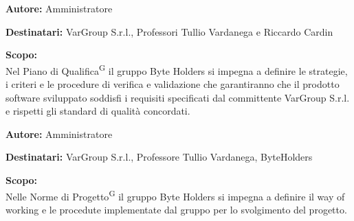 \documentclass[a4paper, 11pt]{article}
\begin{document}

\begin{tcolorbox}[
    colback=LightGray,       %
    colframe=AccentColor,    %
    coltitle=white,          %
    fonttitle=\bfseries\large,
    boxrule=0.5mm,           %
    arc=2mm,                 %
    title={Piano di Qualifica\textsuperscript{G}} %
]
    \textbf{\textcolor{AccentDark}{Autore:}} Amministratore  %
    
    \vspace{0.2cm} %
    \textbf{\textcolor{AccentDark}{Destinatari:}} VarGroup S.r.l., Professori Tullio Vardanega e Riccardo Cardin

    \vspace{0.2cm} %

    \textbf{\textcolor{AccentDark}{Scopo:}} \\
    Nel Piano di Qualifica\textsuperscript{G} il gruppo Byte Holders si impegna a definire le strategie, i criteri e le procedure di verifica e validazione che garantiranno che il prodotto software sviluppato soddisfi i requisiti specificati dal committente VarGroup S.r.l. e rispetti gli standard di qualità concordati.

\end{tcolorbox}



\begin{tcolorbox}[
    colback=LightGray,       %
    colframe=AccentColor,    %
    coltitle=white,          %
    fonttitle=\bfseries\large,
    boxrule=0.5mm,           %
    arc=2mm,                 %
    title={Norme di Progetto\textsuperscript{G}} %
]
    \textbf{\textcolor{AccentDark}{Autore:}} Amministratore  %
    
    \vspace{0.2cm} %
    \textbf{\textcolor{AccentDark}{Destinatari:}} VarGroup S.r.l., Professore Tullio Vardanega, ByteHolders

    \vspace{0.2cm} %

    \textbf{\textcolor{AccentDark}{Scopo:}} \\
    Nelle Norme di Progetto\textsuperscript{G} il gruppo Byte Holders si impegna a definire il way of working e le procedute implementate dal gruppo per lo svolgimento del progetto.
\end{tcolorbox}
\end{document}
